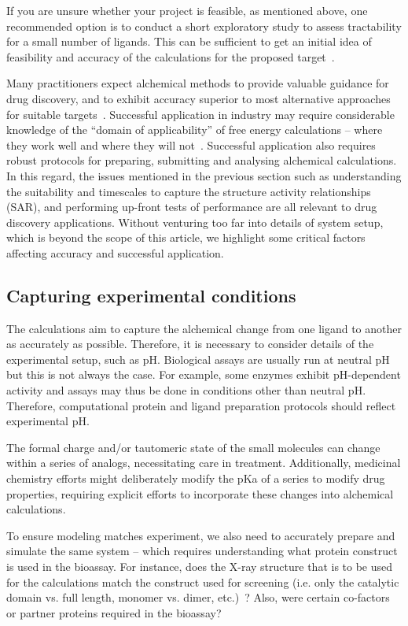 \documentclass[9pt,bestpractices,pubversion]{livecoms}
\begin{document}
If you are unsure whether your project is feasible, as mentioned above, one recommended option is to conduct a short exploratory study to assess tractability for a small
number of ligands. This can be sufficient to get an initial
idea of feasibility and accuracy of the calculations for the
proposed target~\cite{schindler2020largescale}.

Many practitioners expect alchemical methods to provide valuable guidance for drug discovery, and to exhibit accuracy superior to most alternative approaches for suitable targets~\cite{kuhn2017prospective}. Successful application in industry may require considerable knowledge of the ``domain of applicability'' of free energy calculations -- where they work well and where they will not~\cite{sherborne2016collaborating}. Successful application also requires robust protocols for preparing, submitting and analysing alchemical calculations. In this regard, the issues mentioned in the previous section such as understanding the suitability and timescales to capture the structure activity relationships (SAR), and performing up-front tests of performance are all relevant to drug discovery applications. Without venturing too far into details of system setup, which is beyond the scope of this article, we highlight some critical factors affecting accuracy and successful application. 

\subsection{Capturing experimental conditions}
\label{subsec:exp_condition}
The calculations aim to capture the alchemical change from one ligand to another as accurately as possible. Therefore, it is necessary to consider details of the experimental setup, such as pH. Biological assays are usually run at neutral pH but this is not always the case. For example, some enzymes exhibit pH-dependent activity and assays may thus be done in conditions other than neutral pH. Therefore, computational protein and ligand preparation protocols should reflect experimental pH. 

The formal charge and/or tautomeric state of the small molecules can change within a series of analogs, necessitating care in treatment. Additionally, medicinal chemistry efforts might deliberately modify the pKa of a series to modify drug properties, requiring explicit efforts to incorporate these changes into alchemical calculations.

To ensure modeling matches experiment, we also need to accurately prepare and simulate the same system -- which requires understanding what protein construct is used in the bioassay. For instance, does the X-ray structure that is to be used for the calculations match the construct used for screening (i.e. only the catalytic domain vs. full length, monomer vs. dimer, etc.)~\cite{perez-benito2018predicting}? Also, were certain co-factors or partner proteins required in the bioassay? 
\end{document}
